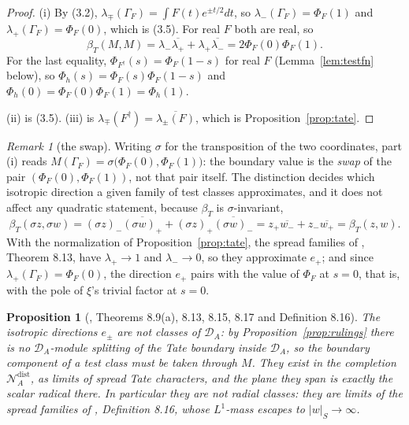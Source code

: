 \documentclass[11pt]{amsart}
\newtheorem{proposition}[theorem]{Proposition}
\theoremstyle{definition}
\theoremstyle{remark}
\newtheorem{remark}[theorem]{Remark}
\newcommand{\DA}{\mathcal D_A}
\begin{document}
\begin{proof}
(i)  By (3.2), $\lambda_\mp(\Gamma_F)=\int F(t)e^{\pm t/2}dt$, so
$\lambda_-(\Gamma_F)=\Phi_F(1)$ and $\lambda_+(\Gamma_F)=\Phi_F(0)$, which is
(3.5).  For real $F$ both are real, so
\[
  \beta_T(M,M)=\lambda_-\overline{\lambda_+}+\lambda_+\overline{\lambda_-}
  =2\Phi_F(0)\Phi_F(1).
\]
For the last equality, $\Phi_{F^\dagger}(s)=\Phi_F(1-s)$ for real $F$
(Lemma~\ref{lem:testfn} below), so
$\Phi_h(s)=\Phi_F(s)\Phi_F(1-s)$ and $\Phi_h(0)=\Phi_F(0)\Phi_F(1)=\Phi_h(1)$.

(ii) is (3.5).  (iii) is $\lambda_\mp(F^\dagger)=\overline{\lambda_\pm(F)}$,
which is Proposition~\ref{prop:tate}.
\end{proof}

\begin{remark}[the swap]
\label{rem:swap}
Writing $\sigma$ for the transposition of the two coordinates, part (i) reads
$M(\Gamma_F)=\sigma\bigl(\Phi_F(0),\Phi_F(1)\bigr)$: the boundary value is the
\emph{swap} of the pair $(\Phi_F(0),\Phi_F(1))$, not that pair itself.  The
distinction decides which isotropic direction a given family of test classes
approximates, and it does not affect any quadratic statement, because $\beta_T$ is $\sigma$-invariant,
\[
  \beta_T(\sigma z,\sigma w)=(\sigma z)_-\overline{(\sigma w)_+}
  +(\sigma z)_+\overline{(\sigma w)_-}
  =z_+\overline{w_-}+z_-\overline{w_+}=\beta_T(z,w).
\]
With the normalization of Proposition~\ref{prop:tate}, the spread families of
\cite{P43}, Theorem 8.13, have $\lambda_+\to1$ and $\lambda_-\to0$, so they
approximate $e_+$; and since $\lambda_+(\Gamma_F)=\Phi_F(0)$, the direction
$e_+$ pairs with the value of $\Phi_F$ at $s=0$, that is, with the pole of
$\xi$'s trivial factor at $s=0$.
\end{remark}

\begin{proposition}[\cite{P43}, Theorems 8.9(a), 8.13, 8.15, 8.17 and
Definition 8.16]
\label{prop:live}
The isotropic directions $e_\pm$ are not classes of $\DA$: by
Proposition~\emph{\ref{prop:rulings}} there is no $\DA$-module splitting of the
Tate boundary inside $\DA$, so the boundary component of a test class must be
taken through $M$.  They exist in the completion
$\mathcal N_A^{\mathrm{dist}}$, as limits of spread Tate characters, and the
plane they span is exactly the scalar radical there.  In particular they are
not radial classes: they are limits of the spread families of
\cite{P43}, Definition 8.16, whose $L^1$-mass escapes to $|w|_S\to\infty$.
\end{proposition}
\end{document}
